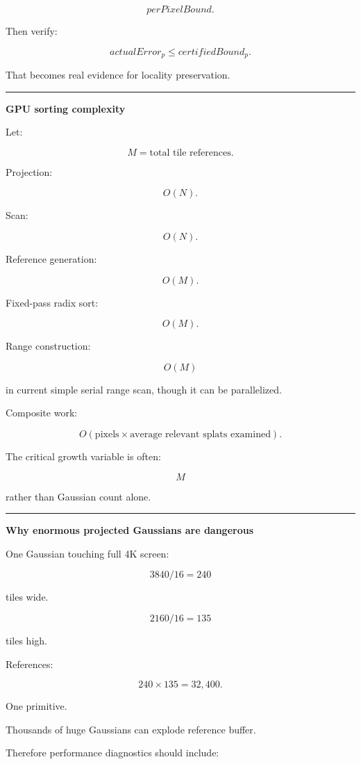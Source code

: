 \[
perPixelBound.
\]

Then verify:

\[
actualError_p
\le
certifiedBound_p.
\]

That becomes real evidence for locality preservation.

\begin{center}\rule{0.5\linewidth}{0.5pt}\end{center}

\textbf{GPU sorting complexity}

Let:

\[
M
=
\text{total tile references}.
\]

Projection:

\[
O(N).
\]

Scan:

\[
O(N).
\]

Reference generation:

\[
O(M).
\]

Fixed-pass radix sort:

\[
O(M).
\]

Range construction:

\[
O(M)
\]

in current simple serial range scan, though it can be parallelized.

Composite work:

\[
O(
\text{pixels}
\times
\text{average relevant splats examined}
).
\]

The critical growth variable is often:

\[
\boxed{M}
\]

rather than Gaussian count alone.

\begin{center}\rule{0.5\linewidth}{0.5pt}\end{center}

\textbf{Why enormous projected Gaussians are dangerous}

One Gaussian touching full 4K screen:

\[
3840/16=240
\]

tiles wide.

\[
2160/16=135
\]

tiles high.

References:

\[
240\times135
=
32,400.
\]

One primitive.

Thousands of huge Gaussians can explode reference buffer.

Therefore performance diagnostics should include:

